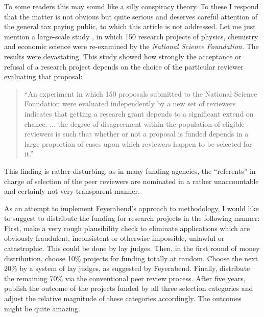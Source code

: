 \documentclass{article}
\begin{document}
To some readers this may sound like a silly conspiracy theory.
To these I respond that the matter is not obvious but
quite serious and deserves careful attention of the general tax paying
public, to which this article is not addressed.
Let me just mention
a large-scale study \cite{1981-cole}, in which 150 research projects of
physics, chemistry and economic science were re-examined by the {\it
National Science Foundation.} The results were devastating.
This study showed how strongly the acceptance or refusal of
a research project depends on the choice of the particular reviewer
evaluating that proposal:
\begin{quote}
{ ``An experiment in which 150
proposals submitted to the National Science Foundation were evaluated
independently by a new set of reviewers indicates that getting a
research grant depends to a significant extend on chance.
$\ldots$
the degree of disagreement within the
population of eligible reviewers is such that whether or not a proposal
is funded depends in a large proportion of cases upon which reviewers
happen to be selected for it.''}
\end{quote}
This finding is rather disturbing, as
in many funding agencies, the ``referents'' in charge
of selection of the peer reviewers
are nominated in a rather unaccountable and
certainly not very transparent  manner.

As an attempt to implement Feyerabend's approach to methodology,
I would like to suggest to distribute the funding for research projects in the following manner:
First, make a very rough plausibility check to eliminate
applications which are obviously fraudulent, inconsistent or otherwise impossible,
unlawful or catastrophic.
This could be done by lay judges.
Then, in the first round of money distribution,
choose 10\%
projects for funding
totally at random.
Choose the next 20\%
by a system of lay judges, as suggested by Feyerabend.
Finally, distribute the remaining 70\%
via the conventional peer review process.
After five years, publish the outcome of the projects funded by all three selection categories
and adjust the relative magnitude of these categories accordingly.
The outcomes might be quite amazing.
\end{document}
